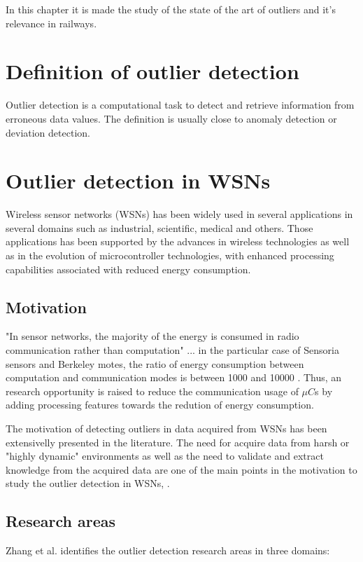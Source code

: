 In this chapter it is  made the study of the state of the art of outliers and it's relevance in railways.


\section{Definition of outlier detection}

Outlier detection is a computational task to detect and retrieve information from erroneous data values. The definition is usually close to anomaly detection or deviation detection. 


\section{Outlier detection in WSNs}

Wireless sensor networks (WSNs) has been widely used in several applications in several domains such as industrial, scientific, medical and others. Those applications has been supported by the advances in wireless technologies as well as in the evolution of microcontroller technologies, with enhanced processing capabilities associated with reduced energy consumption.

\subsection{Motivation}

"In sensor networks, the majority of the energy is consumed in radio communication rather than computation" ... in the particular case of Sensoria sensors and Berkeley motes, the ratio of energy consumption between computation and communication modes is between 1000 and 10000 \cite{class:rajasegarar:2007}. Thus, an research opportunity is raised to reduce the communication usage of $\mu C$s by adding processing features towards the redution of energy consumption.

The motivation of detecting outliers in data acquired from WSNs has been extensivelly presented in the literature. The need for acquire data from harsh or "highly dynamic" environments as well as the need to validate and extract knowledge from the acquired data are one of the main points in the motivation to study the outlier detection in WSNs,  \cite{gen:zhang:2010,gen:chandola:2009,stat:ghorbel:2015,class:martins:2015b}.



\subsection{Research areas}
Zhang et al. \cite{gen:zhang:2010} identifies the outlier detection research areas in three domains: 

